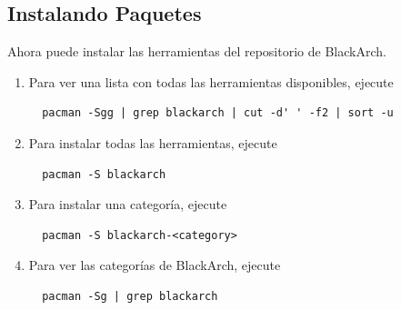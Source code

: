 \documentclass[a4paper, oneside, 11pt]{book}
\begin{document}
\subsection{Instalando Paquetes}
Ahora puede instalar las herramientas del repositorio de BlackArch.
\begin{enumerate}
\item Para ver una lista con todas las herramientas disponibles, ejecute 
\begin{lstlisting}
  pacman -Sgg | grep blackarch | cut -d' ' -f2 | sort -u
\end{lstlisting}

\item Para instalar todas las herramientas, ejecute
\begin{lstlisting}
  pacman -S blackarch
\end{lstlisting}

\item Para instalar una categor\'ia, ejecute
\begin{lstlisting}
  pacman -S blackarch-<category>
\end{lstlisting}

\item Para ver las categor\'ias de BlackArch, ejecute
\begin{lstlisting}
  pacman -Sg | grep blackarch
\end{lstlisting}

\end{enumerate}
\end{document}

